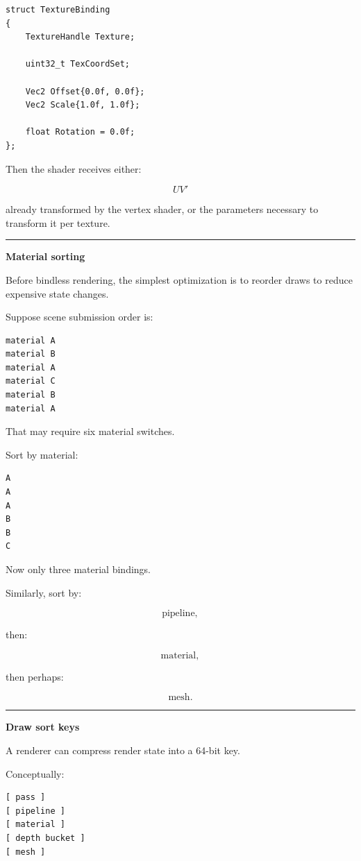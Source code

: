 \begin{verbatim}
struct TextureBinding
{
    TextureHandle Texture;

    uint32_t TexCoordSet;

    Vec2 Offset{0.0f, 0.0f};
    Vec2 Scale{1.0f, 1.0f};

    float Rotation = 0.0f;
};
\end{verbatim}

Then the shader receives either:

\[
UV'
\]

already transformed by the vertex shader, or the parameters necessary to transform it per texture.

\begin{center}\rule{0.5\linewidth}{0.5pt}\end{center}

\textbf{Material sorting}

Before bindless rendering, the simplest optimization is to reorder draws to reduce expensive state changes.

Suppose scene submission order is:

\begin{verbatim}
material A
material B
material A
material C
material B
material A
\end{verbatim}

That may require six material switches.

Sort by material:

\begin{verbatim}
A
A
A
B
B
C
\end{verbatim}

Now only three material bindings.

Similarly, sort by:

\[
\text{pipeline},
\]

then:

\[
\text{material},
\]

then perhaps:

\[
\text{mesh}.
\]

\begin{center}\rule{0.5\linewidth}{0.5pt}\end{center}

\textbf{Draw sort keys}

A renderer can compress render state into a 64-bit key.

Conceptually:

\begin{verbatim}
[ pass ]
[ pipeline ]
[ material ]
[ depth bucket ]
[ mesh ]
\end{verbatim}

